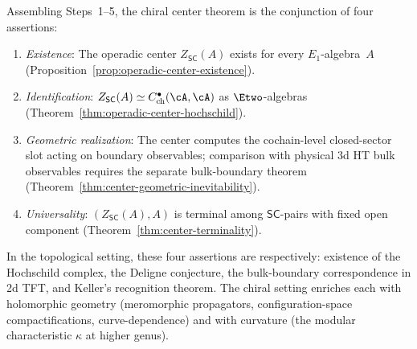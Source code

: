 \begin{remark}
\label{rem:center-theorem-summary}
Assembling Steps~1--5, the chiral center theorem is the conjunction
of four assertions:
\begin{enumerate}[label=\textup{(\arabic*)}]
\item \emph{Existence}: The operadic center
 $Z_{\mathsf{SC}}(A)$ exists for every $E_1$-algebra~$A$
 (Proposition~\ref{prop:operadic-center-existence}).
\item \emph{Identification}: $Z_{\mathsf{SC}}(A) \simeq
 C^{\bullet}_{\mathrm{ch}}(\cA, \cA)$ as $\Etwo$-algebras
 (Theorem~\ref{thm:operadic-center-hochschild}).
\item \emph{Geometric realization}: The center computes the
 cochain-level closed-sector slot acting on boundary observables;
 comparison with physical $3$d HT bulk observables requires the
 separate bulk-boundary theorem
 (Theorem~\ref{thm:center-geometric-inevitability}).
\item \emph{Universality}: $(Z_{\mathsf{SC}}(A), A)$ is
 terminal among $\mathsf{SC}$-pairs with fixed open
 component (Theorem~\ref{thm:center-terminality}).
\end{enumerate}
In the topological setting, these four assertions are respectively:
existence of the Hochschild complex, the Deligne conjecture,
the bulk-boundary correspondence in 2d TFT, and Keller's
recognition theorem. The chiral setting enriches each with
holomorphic geometry (meromorphic propagators, configuration-space
compactifications, curve-dependence) and
with curvature (the modular characteristic $\kappa$ at higher genus).
\end{remark}

